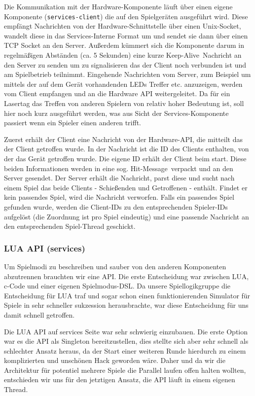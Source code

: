Die Kommunikation mit der Hardware-Komponente läuft über einen eigene Komponente (\texttt{services-client}) die auf den Spielgeräten ausgeführt wird. Diese empfängt Nachrichten von der Hardware-Schnittstelle über einen Unix-Socket, wandelt diese in das Services-Interne Format um und sendet sie dann über einen TCP Socket an den Server. Außerdem kümmert sich die Komponente darum in regelmäßigen Abständen (ca. 5 Sekunden) eine kurze \glqq Keep-Alive\grqq \, Nachricht an den Server zu senden um zu signalisieren das der Client noch verbunden ist und am Spielbetrieb teilnimmt. 
Eingehende Nachrichten vom Server, zum Beispiel um mittels der auf dem Gerät vorhandenden LEDs Treffer etc. anzuzeigen, werden vom Client empfangen und an die Hardware API weitergeleitet.\newline \newline
Da für ein Lasertag das Treffen von anderen Spielern von relativ hoher Bedeutung ist, soll hier noch kurz ausgeführt werden, was aus Sicht der Services-Komponente passiert wenn ein Spieler einen anderen trifft.

Zuerst erhält der Client eine Nachricht von der Hardware-API, die mitteilt das der Client getroffen wurde. In der Nachricht ist die ID des Clients enthalten, von der das Gerät getroffen wurde. Die eigene ID erhält der Client beim start. Diese beiden Informationen werden in eine sog. \glqq Hit-Message\grqq \, verpackt und an den Server gesendet. 
Der Server erhält die Nachricht, parst diese und sucht nach einem Spiel das beide Clients - Schießenden und Getroffenen - enthält. Findet er kein passendes Spiel, wird die Nachricht verworfen. Falls ein passendes Spiel gefunden wurde, werden die Client-IDs zu den entsprechenden Spieler-IDs aufgelöst (die Zuordnung ist pro Spiel eindeutig) und eine passende Nachricht an den entsprechenden Spiel-Thread geschickt.

\subsubsection{LUA API (services)}

Um Spielmodi zu beschreiben und sauber von den anderen Komponenten abzutrennen brauchten wir eine API. Die erste Entscheidung war zwischen LUA, c-Code und einer eigenen Spielmodus-DSL. Da unsere Spiellogikgruppe die Entscheidung für LUA traf und sogar schon einen funktionierenden Simulator für Spiele in sehr schneller sukzession herausbrachte, war diese Entscheidung für uns damit schnell getroffen.

Die LUA API auf services Seite war sehr schwierig einzubauen. Die erste Option war es die API als Singleton bereitzustellen, dies stellte sich aber sehr schnell als schlechter Ansatz heraus, da der Start einer weiteren Runde hierdurch zu einem komplizierten und unschönen Hack geworden wäre. Daher und da wir die Architektur für potentiel mehrere Spiele die Parallel laufen offen halten wollten, entschieden wir uns für den jetztigen Ansatz, die API läuft in einem eigenen Thread. 

